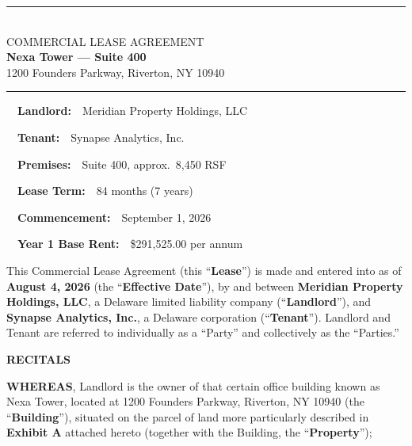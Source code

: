 \documentclass[10pt,a4paper]{scrreprt}
\newcommand{\factrow}[3]{%
  \noindent{\color{leasegold}#1}\ \ {\bfseries\color{leasenavy}#2:}\ \ #3\par\smallskip%
}
\begin{document}
\thispagestyle{fancy}

\begin{center}
  {\color{leasegold}\rule{4cm}{1.2pt}}\\[6pt]
  {\Large\color{leaseslate} COMMERCIAL LEASE AGREEMENT}\\[2pt]
  {\huge\bfseries\color{leasenavy} Nexa Tower --- Suite 400}\\[6pt]
  {\color{leaseslate} 1200 Founders Parkway, Riverton, NY 10940}\\[4pt]
  {\color{leasegold}\rule{4cm}{1.2pt}}
\end{center}

\vspace{5pt}

\noindent\begin{tcolorbox}[colback=leasepaper,colframe=leaseline,boxrule=0.8pt,arc=2pt,
  left=12pt,right=12pt,top=10pt,bottom=10pt]
\begin{minipage}[t]{0.48\textwidth}
  \factrow{\faBuilding}{Landlord}{Meridian Property Holdings, LLC}
  \factrow{\faUsers}{Tenant}{Synapse Analytics, Inc.}
  \factrow{\faMapMarker}{Premises}{Suite 400, approx.\ 8{,}450 RSF}
\end{minipage}\hfill
\begin{minipage}[t]{0.48\textwidth}
  \factrow{\faCalendar}{Lease Term}{84 months (7 years)}
  \factrow{\faClock}{Commencement}{September 1, 2026}
  \factrow{\faDollarSign}{Year 1 Base Rent}{\$291{,}525.00 per annum}
\end{minipage}
\end{tcolorbox}

\vspace{6pt}

This Commercial Lease Agreement (this ``\textbf{Lease}'') is made and entered into as of
\textbf{August 4, 2026} (the ``\textbf{Effective Date}''), by and between
\textbf{Meridian Property Holdings, LLC}, a Delaware limited liability company
(``\textbf{Landlord}''), and \textbf{Synapse Analytics, Inc.}, a Delaware corporation
(``\textbf{Tenant}''). Landlord and Tenant are referred to individually as a ``Party'' and
collectively as the ``Parties.''

\textbf{RECITALS}

\textbf{WHEREAS}, Landlord is the owner of that certain office building known as Nexa Tower,
located at 1200 Founders Parkway, Riverton, NY 10940 (the ``\textbf{Building}''), situated on
the parcel of land more particularly described in \textbf{Exhibit A} attached hereto (together
with the Building, the ``\textbf{Property}'');
\end{document}
